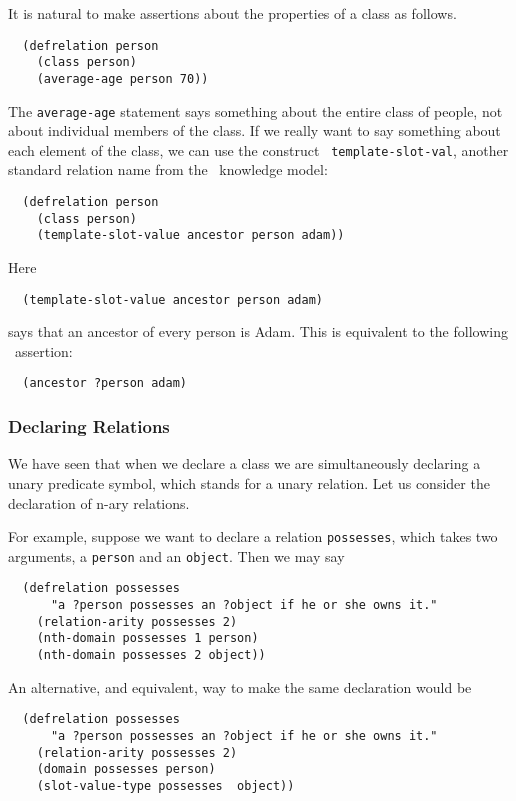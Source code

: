 It is natural to make assertions about the properties of a class
as follows.
\begin{verbatim}
  (defrelation person
    (class person)
    (average-age person 70))
\end{verbatim}
The \verb'average-age' statement says something about the entire class of
people, not about individual members of the class.  If we really want to say
something about each element of the class, we can use the construct {\tt
template-slot-val}, another standard relation name from the \okbc\
knowledge model:

\begin{verbatim}
  (defrelation person
    (class person)
    (template-slot-value ancestor person adam))
\end{verbatim}
Here
\begin{verbatim}
  (template-slot-value ancestor person adam)
\end{verbatim}
says that an ancestor of every person is Adam.  This
is equivalent to the following \snark\  assertion:
\begin{verbatim}
  (ancestor ?person adam)
\end{verbatim}

\subsubsection{Declaring Relations}
\label{subsec-kif-relations}

We have seen that when we declare a class we are simultaneously declaring a
unary predicate symbol, which stands for a unary relation.  Let us consider
the declaration of n-ary relations.

For example, suppose we want to declare a relation \verb'possesses', which
takes two arguments, a \verb'person' and an \verb'object'.  Then we may say
\begin{verbatim}
  (defrelation possesses
      "a ?person possesses an ?object if he or she owns it."
    (relation-arity possesses 2)
    (nth-domain possesses 1 person)
    (nth-domain possesses 2 object))
\end{verbatim}

An alternative, and equivalent, way to make the same declaration would
be
\begin{verbatim}
  (defrelation possesses
      "a ?person possesses an ?object if he or she owns it."
    (relation-arity possesses 2)
    (domain possesses person)
    (slot-value-type possesses  object))
\end{verbatim}



